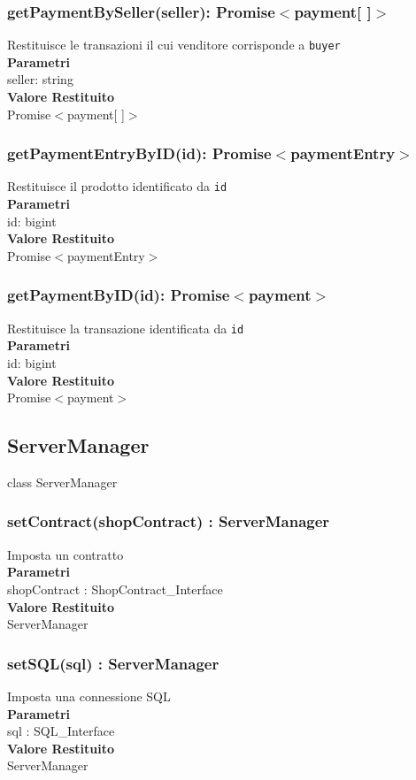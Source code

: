 \documentclass[a4paper, 12pt]{article}
\begin{document}
\subsubsection{getPaymentBySeller(seller): Promise$<$payment[ ]$>$}
Restituisce le transazioni il cui venditore corrisponde a \texttt{buyer}\\
\textbf{Parametri}\\
seller: string\\
\textbf{Valore Restituito}\\
Promise$<$payment[ ]$>$
\subsubsection{getPaymentEntryByID(id): Promise$<$paymentEntry$>$}
Restituisce il prodotto identificato da \texttt{id}\\
\textbf{Parametri}\\
id: bigint\\
\textbf{Valore Restituito}\\
Promise$<$paymentEntry$>$
\subsubsection{getPaymentByID(id): Promise$<$payment$>$}
Restituisce la transazione identificata da \texttt{id}\\
\textbf{Parametri}\\
id: bigint\\
\textbf{Valore Restituito}\\
Promise$<$payment$>$

\subsection{ServerManager}
class ServerManager
\subsubsection{setContract(shopContract) : ServerManager}
Imposta un contratto\\
\textbf{Parametri}\\
shopContract : ShopContract\_Interface\\
\textbf{Valore Restituito}\\
ServerManager\\
\subsubsection{setSQL(sql) : ServerManager}
Imposta una connessione SQL\\
\textbf{Parametri}\\
sql : SQL\_Interface\\
\textbf{Valore Restituito}\\
ServerManager
\end{document}
